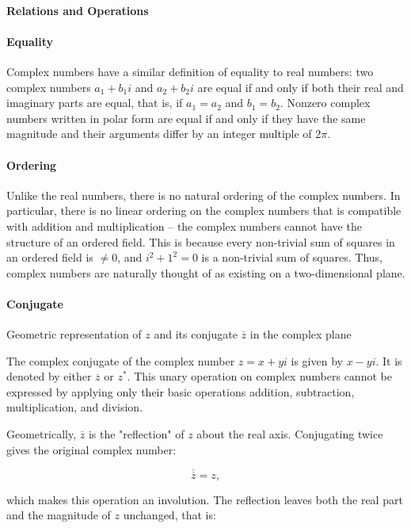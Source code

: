 \paragraph{Relations and Operations}

\paragraph{Equality}

Complex numbers have a similar definition of equality to real numbers: two complex numbers $a_1 + b_1i$ and $a_2 + b_2i$ are equal if and only if both their real and imaginary parts are equal, that is, if $a_1 = a_2$ and $b_1 = b_2$. Nonzero complex numbers written in polar form are equal if and only if they have the same magnitude and their arguments differ by an integer multiple of $2\pi$.

\paragraph{Ordering}

Unlike the real numbers, there is no natural ordering of the complex numbers. In particular, there is no linear ordering on the complex numbers that is compatible with addition and multiplication – the complex numbers cannot have the structure of an ordered field. This is because every non-trivial sum of squares in an ordered field is $\neq 0$, and $i^2 + 1^2 = 0$ is a non-trivial sum of squares. Thus, complex numbers are naturally thought of as existing on a two-dimensional plane.

\paragraph{Conjugate}

Geometric representation of $z$ and its conjugate $\overline{z}$ in the complex plane

The complex conjugate of the complex number $z = x + yi$ is given by $x - yi$. It is denoted by either $\overline{z}$ or $z^*$. This unary operation on complex numbers cannot be expressed by applying only their basic operations addition, subtraction, multiplication, and division.

Geometrically, $\overline{z}$ is the "reflection" of $z$ about the real axis. Conjugating twice gives the original complex number:

$$\overline{\overline{z}} = z,$$

which makes this operation an involution. The reflection leaves both the real part and the magnitude of $z$ unchanged, that is:

